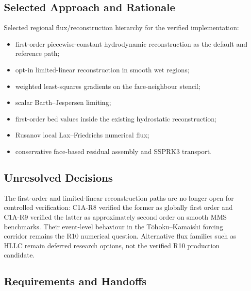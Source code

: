 
\subsection{Selected Approach and Rationale}
\label{sec:res-num-flx-selected-approach}


Selected regional flux/reconstruction hierarchy for the verified
implementation:

\begin{itemize}
  \item first-order piecewise-constant hydrodynamic reconstruction as
    the default and reference path;
  \item opt-in limited-linear reconstruction in smooth wet regions;
  \item weighted least-squares gradients on the face-neighbour stencil;
  \item scalar Barth--Jespersen limiting;
  \item first-order bed values inside the existing hydrostatic
    reconstruction;
  \item Rusanov local Lax--Friedrichs numerical flux;
  \item conservative face-based residual assembly and SSPRK3 transport.
\end{itemize}

\subsection{Unresolved Decisions}
\label{sec:res-num-flx-unresolved-decisions}


The first-order and limited-linear reconstruction paths are no longer
open for controlled verification: C1A-R8 verified the former as globally
first order and C1A-R9 verified the latter as approximately second order
on smooth MMS benchmarks. Their event-level behaviour in the
Tōhoku--Kamaishi forcing corridor remains the R10 numerical question.
Alternative flux families such as HLLC remain deferred research options,
not the verified R10 production candidate.

\subsection{Requirements and Handoffs}
\label{sec:res-num-flx-requirements}


